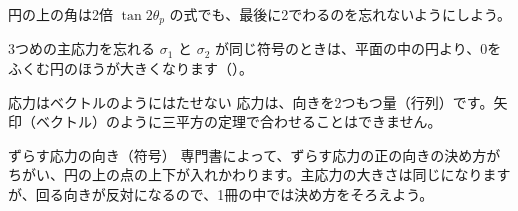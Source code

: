 \begin{tsumazuki}{円の上の角は2倍}
$\tan2\theta_p$ の式でも、最後に2でわるのを忘れないようにしよう。
\end{tsumazuki}
\begin{tsumazuki}{3つめの主応力を忘れる}
$\sigma_1$ と $\sigma_2$ が同じ符号のときは、平面の中の円より、0をふくむ円のほうが大きくなります（）。
\end{tsumazuki}
\begin{tsumazuki}{応力はベクトルのようにはたせない}
応力は、向きを2つもつ量（行列）です。矢印（ベクトル）のように三平方の定理で合わせることはできません。
\end{tsumazuki}
\begin{tsumazuki}{ずらす応力の向き（符号）}
専門書によって、ずらす応力の正の向きの決め方がちがい、円の上の点の上下が入れかわります。主応力の大きさは同じになりますが、回る向きが反対になるので、1冊の中では決め方をそろえよう。
\end{tsumazuki}

